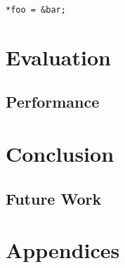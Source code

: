 \documentclass{UoYCSproject}
\begin{document}
\begin{lstlisting}[label=c_1, caption=Placeholder C Code]
*foo = &bar;
\end{lstlisting}


\chapter{Evaluation}
\section{Performance}


\chapter{Conclusion}
\section{Future Work}



\chapter{Appendices}
\end{document}
